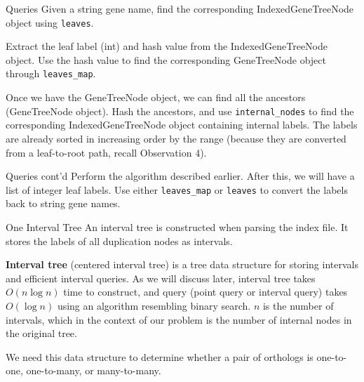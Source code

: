 \documentclass{beamer}
\begin{document}
\begin{frame}{Queries}
    Given a string gene name, find the corresponding IndexedGeneTreeNode object using \texttt{leaves}. 
    
    Extract the leaf label (int) and hash value from the IndexedGeneTreeNode object. Use the hash value to find the corresponding GeneTreeNode object through \texttt{leaves\_map}. 
    
    Once we have the GeneTreeNode object, we can find all the ancestors (GeneTreeNode object). Hash the ancestors, and use \texttt{internal\_nodes} to find the corresponding IndexedGeneTreeNode object containing internal labels. The labels are already sorted in increasing order by the range (because they are converted from a leaf-to-root path, recall Observation 4).
\end{frame}

\begin{frame}{Queries cont'd}
    Perform the algorithm described earlier. After this, we will have a list of integer leaf labels. Use either \texttt{leaves\_map} or \texttt{leaves} to convert the labels back to string gene names.
\end{frame}



\begin{frame}{One Interval Tree}
    An interval tree is constructed when parsing the index file. It stores the labels of all duplication nodes as intervals.
    
    \textbf{Interval tree} (centered interval tree) is a tree data structure for storing intervals and efficient interval queries. As we will discuss later, interval tree takes $O(n \log n)$ time to construct, and query (point query or interval query) takes $O(\log n)$ using an algorithm resembling binary search. $n$ is the number of intervals, which in the context of our problem is the number of internal nodes in the original tree.

    We need this data structure to determine whether a pair of orthologs is one-to-one, one-to-many, or many-to-many.
\end{frame}
\end{document}
